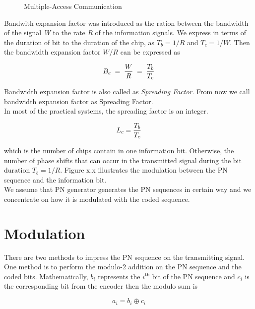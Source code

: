 \begin{figure}[htb]
\centerline{  }
\caption{Multiple-Access Communication}
\end{figure}

Bandwith expansion factor was introduced as the ration between the bandwidth of the signal \textit{W} to the rate \textit{R} of the information signals. We express in terms of the duration of bit to the duration of the chip, as $T_b=1/R$ and $T_c=1/W$. Then the bandwidth expansion factor $W/R$ can be expressed as

\begin{equation}
B_e\;=\;\frac{\hbox{$W$}}{\hbox{$R$}}\;=\;\frac{\hbox{$T_b$}}{\hbox{$T_c$}}
\end{equation}

Bandwidth expansion factor is also called as \textit{Spreading Factor}. From now we call bandwidth expansion factor as Spreading Factor.\\ In most of the practical systems, the spreading factor is an integer.

\begin{equation}
L_c=\frac{\hbox{$T_b$}}{\hbox{$T_c$}}
\end{equation}

which is the number of chips contain in one information bit. Otherwise, the number of phase shifts that can occur in the transmitted signal during the bit duration $T_b=1/R$. Figure x.x illustrates the modulation between the PN sequence and the information bit. \\ 

We assume that PN generator generates the PN sequences in certain way and we concentrate on how it is modulated with the coded sequence. 

\section{Modulation}

There are two methods to impress the PN sequence on the transmitting signal. One method is to perform the modulo-2 addition on the PN sequence and the coded bits. Mathematically, $b_i$ represents the $i^{\mathrm{th}}$ bit of the PN sequence and $c_i$ is the corresponding bit from the encoder then the modulo sum is

\begin{equation}
	a_i = b_i \oplus c_i
\end{equation}

